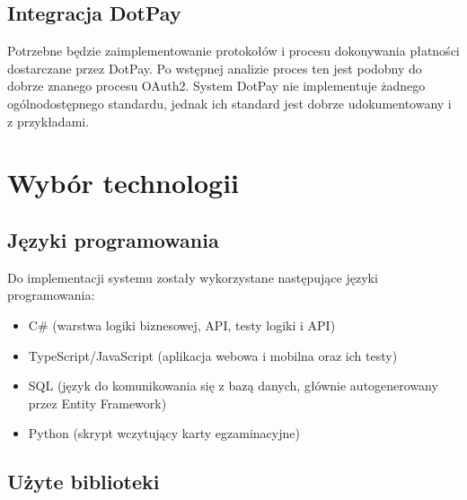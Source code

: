 \documentclass{article}
\begin{document}
\subsection{Integracja DotPay}
Potrzebne będzie zaimplementowanie protokołów i procesu dokonywania płatności dostarczane przez DotPay. Po wstępnej analizie proces ten jest podobny do dobrze znanego procesu OAuth2. System DotPay nie implementuje żadnego ogólnodostępnego standardu, jednak ich standard jest dobrze udokumentowany i z przykładami. \cite{dotpay}

\section{Wybór technologii}
\subsection{Języki programowania}
Do implementacji systemu zostały wykorzystane następujące języki programowania: 
\begin{itemize}
    \item C\# (warstwa logiki biznesowej, API, testy logiki i API)
    \item TypeScript/JavaScript (aplikacja webowa i mobilna oraz ich testy)
    \item SQL (język do komunikowania się z bazą danych, głównie autogenerowany przez Entity Framework)
    \item Python (skrypt wczytujący karty egzaminacyjne)
\end{itemize}

\subsection{Użyte biblioteki}
\end{document}
